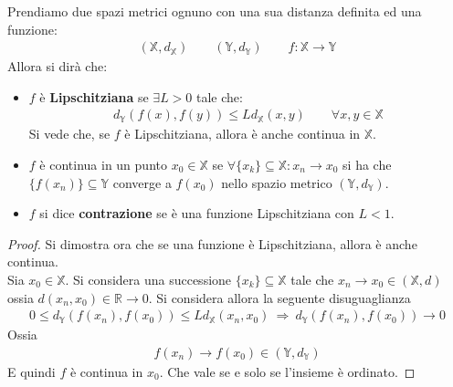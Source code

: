 \documentclass[a4paper, oneside]{book}
\begin{document}
\begin{definition}
    Prendiamo due spazi metrici ognuno con una sua distanza definita ed una funzione:
    \begin{gather*}
        (\mathbb{X}, d_{\mathbb{X}}) \qquad (\mathbb{Y}, d_{\mathbb{Y}}) \qquad f: \mathbb{X} \to \mathbb{Y}
    \end{gather*}
    Allora si dirà che:
    \begin{itemize}
        \item $f$ è \textbf{Lipschitziana} se $\exists L > 0$ tale che: 
        \begin{align}
            d_\mathbb{Y}(f(x), f(y)) \leq L d_\mathbb{X}(x, y) \qquad \forall x, y \in \mathbb{X}
        \end{align}
        Si vede che, se $f$ è Lipschitziana, allora è anche continua in $\mathbb{X}$.
        \item $f$ è continua in un punto $x_0 \in \mathbb{X}$ se $\forall \{x_k\} \subseteq \mathbb{X} : x_n \to x_0$
        si ha che $\{f(x_n)\} \subseteq \mathbb{Y}$ converge a $f(x_0)$ nello spazio metrico $(\mathbb{Y}, d_\mathbb{Y})$.
        \item $f$ si dice \textbf{contrazione} se è una funzione Lipschitziana con $L < 1$. 
    \end{itemize} 
\end{definition}
\begin{proof}
    Si dimostra ora che se una funzione è Lipschitziana, allora è anche
    continua. \\
    Sia $x_0 \in \mathbb{X}$. Si considera una successione $\{x_k\} \subseteq \mathbb{X}$ tale che
    $x_n \to x_0 \in (\mathbb{X}, d)$ ossia $d(x_n, x_0) \in \mathbb{R} \to 0$. Si considera allora la seguente 
    disuguaglianza 
    \begin{gather*}
        0 \leq d_\mathbb{Y}(f(x_n), f(x_0)) \leq L d_\mathbb{X}(x_n, x_0) \ \Longrightarrow \ d_\mathbb{Y}(f(x_n), f(x_0)) \to 0
    \end{gather*} 
    Ossia
    \begin{gather*}
        f(x_n) \to f(x_0) \in (\mathbb{Y}, d_\mathbb{Y})
    \end{gather*}
    E quindi $f$ è continua in $x_0$. Che vale se e solo se l'insieme è ordinato. 
\end{proof}
\end{document}
